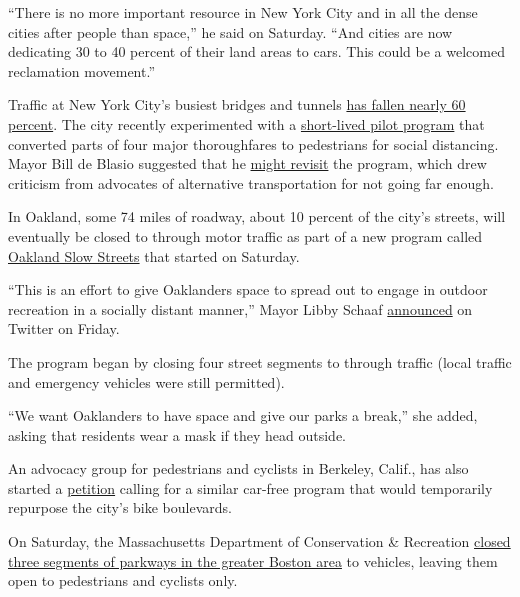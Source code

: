 ``There is no more important resource in New York City and in all the
dense cities after people than space,'' he said on Saturday. ``And
cities are now dedicating 30 to 40 percent of their land areas to cars.
This could be a welcomed reclamation movement.''

Traffic at New York City's busiest bridges and tunnels
\href{https://www.nytimes3xbfgragh.onion/2020/04/09/nyregion/nyc-coronavirus-empty-streets.html}{has
fallen nearly 60 percent}. The city recently experimented with a
\href{https://www.nytimes3xbfgragh.onion/2020/04/09/nyregion/nyc-coronavirus-empty-streets.html}{short-lived
pilot program} that converted parts of four major thoroughfares to
pedestrians for social distancing. Mayor Bill de Blasio suggested that
he
\href{https://nyc.streetsblog.org/2020/04/05/mayor-de-blasio-open-streets-are-not-a-priority-right-now/}{might
revisit} the program, which drew criticism from advocates of alternative
transportation for not going far enough.

In Oakland, some 74 miles of roadway, about 10 percent of the city's
streets, will eventually be closed to through motor traffic as part of a
new program called
\href{https://www.oaklandca.gov/projects/oakland-slow-streets}{Oakland
Slow Streets} that started on Saturday.

``This is an effort to give Oaklanders space to spread out to engage in
outdoor recreation in a socially distant manner,'' Mayor Libby Schaaf
\href{https://twitter.com/LibbySchaaf/status/1248793687774990336}{announced}
on Twitter on Friday.

The program began by closing four street segments to through traffic
(local traffic and emergency vehicles were still permitted).

``We want Oaklanders to have space and give our parks a break,'' she
added, asking that residents wear a mask if they head outside.

An advocacy group for pedestrians and cyclists in Berkeley, Calif., has
also started a
\href{https://docs.google.com/forms/d/e/1FAIpQLSdIXHpAjaZVu9hTSbRgx7z5YAtl3ZiNsJTw3WA3-awvywsd9w/viewform}{petition}
calling for a similar car-free program that would temporarily repurpose
the city's bike boulevards.

On Saturday, the Massachusetts Department of Conservation \& Recreation
\href{https://www.mass.gov/news/baker-polito-administration-announces-additional-measures-to-reduce-crowding-at-state-parks}{closed
three segments of parkways in the greater Boston area} to vehicles,
leaving them open to pedestrians and cyclists only.

